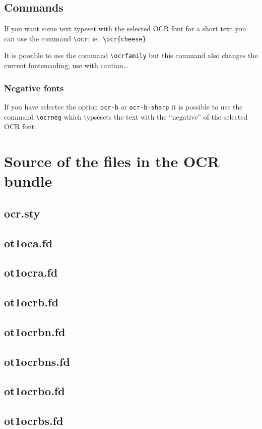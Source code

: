 \documentclass{article}
\newcommand*\sourcefile[1]{\subsection{#1}
  }
\begin{document}
\subsection{Commands}
\label{sec:commands}

If you want some text typeset with the selected OCR font for a short
text you can use the command \verb+\ocr+; ie.\ \verb+\ocr{cheese}+.

It is possible to use the command \verb+\ocrfamily+ but this command
also changes the current fontencoding; use with caution\dots

\subsubsection{Negative fonts}
\label{sec:negative-fonts}

If you have selectec the option \verb+ocr-b+ or \verb+ocr-b-sharp+ it
is possible to use the command \verb+\ocrneg+ which typsesets the text
with the ``negative'' of the selected OCR font.

\clearpage
\section{Source of the files in the OCR bundle}
\label{sec:source}

\sourcefile{ocr.sty}
\sourcefile{ot1oca.fd}
\sourcefile{ot1ocra.fd}
\sourcefile{ot1ocrb.fd}
\sourcefile{ot1ocrbn.fd}
\sourcefile{ot1ocrbns.fd}
\clearpage
\sourcefile{ot1ocrbo.fd}
\sourcefile{ot1ocrbs.fd}
\end{document}
